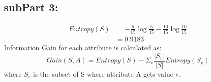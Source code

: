 \documentclass[a4paper,11pt]{article}
\begin{document}
\begin{mlsolution}
\subsection{subPart 3:}
\begin{align*}
Entropy(S)  &= -\frac{5}{15} \log\frac{5}{15} - \frac{10}{15} \log\frac{10}{15}\\
			&= 0.9183
\end{align*}
Information Gain for each attribute is calculated as:
$$ Gain(S, A) = Entropy(S) - \Sigma_{v} \frac{|S_v|}{|S|} Entropy(S_v)$$
where $S_v$ is the subset of S where attribute A gets value v.


\end{mlsolution}
\end{document}
